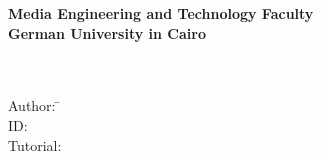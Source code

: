 \newcommand{\titlePage}{

\thispagestyle{empty}
\begin{center}
  \textbf{Media Engineering and Technology Faculty}\\[1mm]
  \textbf{German University in Cairo}\\[1mm]
  
  \vspace{2cm}
  \doublespacing
  {\Huge \textbf{\titleOfThesisOne}}\\
  \singlespacing
  \vspace{2cm}
  {\large \textbf{\typeOfThesis}}\\
  
  \vfill
  \parbox{1cm}{
      \begin{large}
          \begin{tabbing}
            Author: \hspace{2cm}  
              \=\authorOfThesis\\[2mm]
            ID:
              \>\id\\[2mm]
            Tutorial:  
              \>\tutorial\\[2mm]
          \end{tabbing}
      \end{large}
  }\\
\end{center}
\clearpage
}
\titlePage

\clearpage
